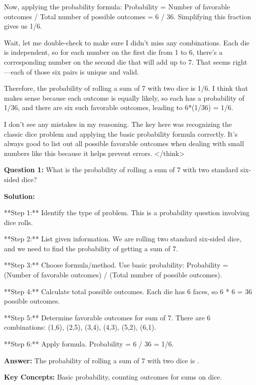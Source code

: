 Now, applying the probability formula: Probability = Number of favorable outcomes / Total number of possible outcomes = 6 / 36. Simplifying this fraction gives us 1/6.

Wait, let me double-check to make sure I didn't miss any combinations. Each die is independent, so for each number on the first die from 1 to 6, there's a corresponding number on the second die that will add up to 7. That seems right—each of those six pairs is unique and valid.

Therefore, the probability of rolling a sum of 7 with two dice is 1/6. I think that makes sense because each outcome is equally likely, so each has a probability of 1/36, and there are six such favorable outcomes, leading to 6*(1/36) = 1/6.

I don't see any mistakes in my reasoning. The key here was recognizing the classic dice problem and applying the basic probability formula correctly. It's always good to list out all possible favorable outcomes when dealing with small numbers like this because it helps prevent errors.
</think>

\textbf{Question 1:} What is the probability of rolling a sum of 7 with two standard six-sided dice?

\textbf{Solution:}

**Step 1:** Identify the type of problem. This is a probability question involving dice rolls.

**Step 2:** List given information. We are rolling two standard six-sided dice, and we need to find the probability of getting a sum of 7.

**Step 3:** Choose formula/method. Use basic probability: Probability = (Number of favorable outcomes) / (Total number of possible outcomes).

**Step 4:** Calculate total possible outcomes. Each die has 6 faces, so 6 * 6 = 36 possible outcomes.

**Step 5:** Determine favorable outcomes for sum of 7. There are 6 combinations: (1,6), (2,5), (3,4), (4,3), (5,2), (6,1).

**Step 6:** Apply formula. Probability = 6 / 36 = 1/6.

\textbf{Answer:} The probability of rolling a sum of 7 with two dice is .

\textbf{Key Concepts:} Basic probability, counting outcomes for sums on dice.